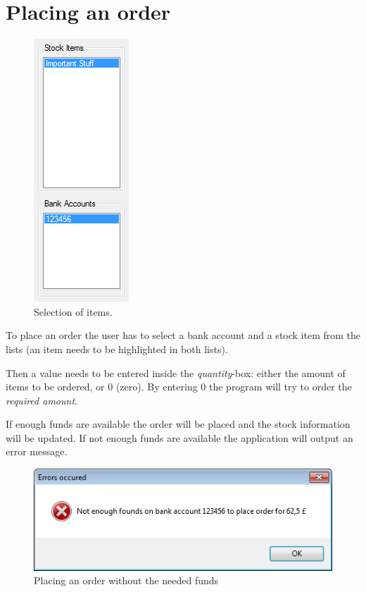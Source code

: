\section{Placing an order}
\label{sec:placing_order}

\begin{figure} %
\centering
\includegraphics[scale=0.6]{gfx/highlighted_items.png}
\caption{Selection of items.}
\label{fig:highlighted_items}
\end{figure}

To place an order the user has to select a bank account and a stock item from the lists (an item needs to be highlighted in both lists).

Then a value needs to be entered inside the \textit{quantity}-box: either the amount of items to be ordered, or 0 (zero). By entering 0 the program will try to order the \textit{required amount}.

If enough funds are available the order will be placed and the stock information will be updated.
If not enough funds are available the application will output an error message.

\begin{figure}[H]
\begin{center}
\includegraphics[scale=0.8]{gfx/not_enough_funds.png}
\caption{Placing an order without the needed funds}
\label{fig:not_enough_funds}
\end{center}
\end{figure}


